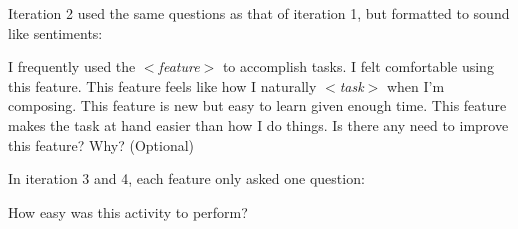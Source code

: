 		Iteration 2 used the same questions as that of iteration 1, but formatted to sound like sentiments: 
		\begin{outline}
			\1 I frequently used the \textit{$<$feature$>$} to accomplish tasks.
			\1 I felt comfortable using this feature.
			\1 This feature feels like how I naturally \textit{$<$task$>$} when I'm composing.
			\1 This feature is new but easy to learn given enough time.
			\1 This feature makes the task at hand easier than how I do things.
			\1 Is there any need to improve this feature? Why? (Optional)	
		\end{outline}

		In iteration 3 and 4, each feature only asked one question: 
			\begin{outline}
				\1 How easy was this activity to perform?
			\end{outline}

